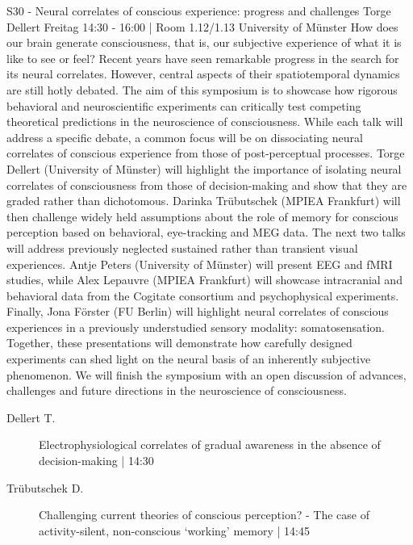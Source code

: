
            \begin{symposium}
            {S30 - Neural correlates of conscious experience: progress and challenges}
            {Torge Dellert}
            {Freitag 14:30 - 16:00 | Room 1.12/1.13}
            {University of Münster}
            How does our brain generate consciousness, that is, our subjective experience of what it is like to see or feel? Recent years have seen remarkable progress in the search for its neural correlates. However, central aspects of their spatiotemporal dynamics are still hotly debated. The aim of this symposium is to showcase how rigorous behavioral and neuroscientific experiments can critically test competing theoretical predictions in the neuroscience of consciousness. While each talk will address a specific debate, a common focus will be on dissociating neural correlates of conscious experience from those of post-perceptual processes.
Torge Dellert (University of Münster) will highlight the importance of isolating neural correlates of consciousness from those of decision-making and show that they are graded rather than dichotomous. Darinka Trübutschek (MPIEA Frankfurt) will then challenge widely held assumptions about the role of memory for conscious perception based on behavioral, eye-tracking and MEG data. The next two talks will address previously neglected sustained rather than transient visual experiences. Antje Peters (University of Münster) will present EEG and fMRI studies, while Alex Lepauvre (MPIEA Frankfurt) will showcase intracranial and behavioral data from the Cogitate consortium and psychophysical experiments. Finally, Jona Förster (FU Berlin) will highlight neural correlates of conscious experiences in a previously understudied sensory modality: somatosensation.
Together, these presentations will demonstrate how carefully designed experiments can shed light on the neural basis of an inherently subjective phenomenon. We will finish the symposium with an open discussion of advances, challenges and future directions in the neuroscience of consciousness.
            \begin{description}    
            
                \item [ Dellert T.] Electrophysiological correlates of gradual awareness in the absence of decision-making \textcolor{mygray}{ | 14:30}    
                
                \item [ Trübutschek D.] Challenging current theories of conscious perception? - The case of activity-silent, non-conscious ‘working’ memory \textcolor{mygray}{ | 14:45}    
                

\end{description}
\end{symposium}

